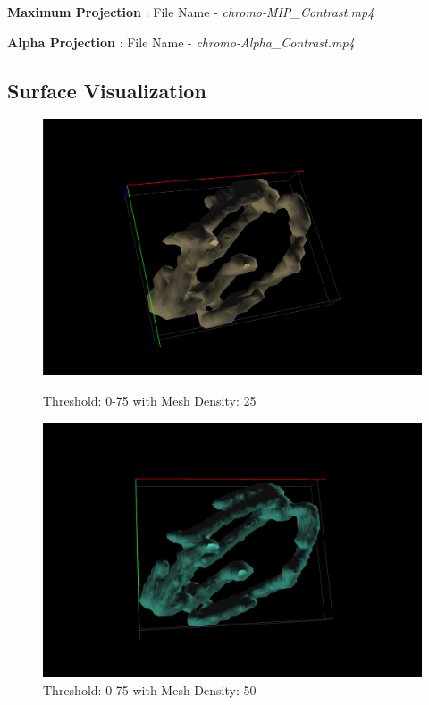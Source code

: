 \documentclass{article}
\begin{document}
\medskip

\textbf{Maximum Projection} : File Name - \textit{chromo-MIP\_Contrast.mp4}

\textbf{Alpha Projection} : File Name - \textit{chromo-Alpha\_Contrast.mp4}
\subsection*{Surface Visualization}

\begin{figure}[h!]
  \centering
  \begin{minipage}[b]{0.5\linewidth}
    \centering
    \includegraphics[width=.8\linewidth]{Report/Images/6.3.2/0-75,25.png}
    \captionsetup{width=.8\linewidth}
    \caption{Threshold: 0-75 with Mesh Density: 25}
    \label{fig:075_25}
    \vspace{4ex}
  \end{minipage}%
  \begin{minipage}[b]{0.5\linewidth}
    \centering
    \includegraphics[width=.8\linewidth]{Report/Images/6.3.2/0-75,50.png}
    \captionsetup{width=.8\linewidth}
    \caption{Threshold: 0-75 with Mesh Density: 50}
    \label{fig:075_50}

\end{minipage}
\end{figure}
\end{document}
